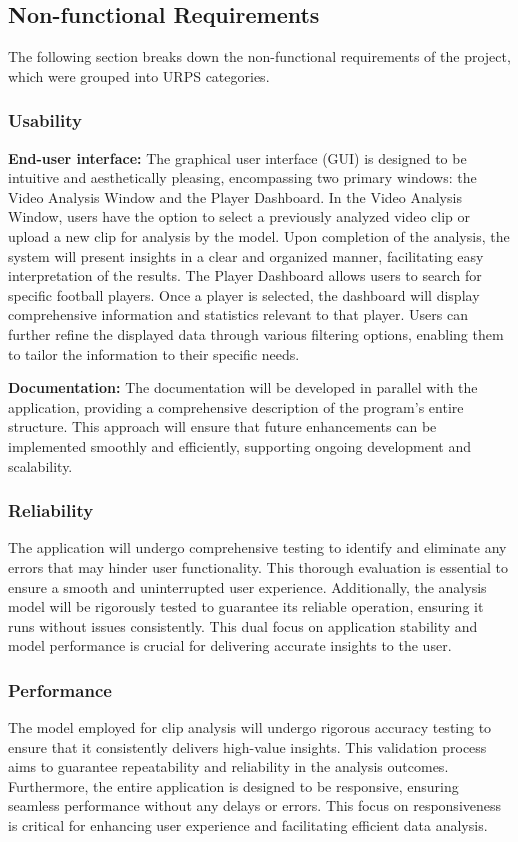 \documentclass{article}
\begin{document}
\subsection{Non-functional Requirements}
The following section breaks down the non-functional requirements of the project, which were grouped into URPS categories.
\subsubsection{Usability}
\textbf{End-user interface:} The graphical user interface (GUI) is designed to be intuitive and aesthetically pleasing, encompassing two primary windows: the Video Analysis Window and the Player Dashboard. In the Video Analysis Window, users have the option to select a previously analyzed video clip or upload a new clip for analysis by the model. Upon completion of the analysis, the system will present insights in a clear and organized manner, facilitating easy interpretation of the results. The Player Dashboard allows users to search for specific football players. Once a player is selected, the dashboard will display comprehensive information and statistics relevant to that player. Users can further refine the displayed data through various filtering options, enabling them to tailor the information to their specific needs.

\vspace{1em}

\noindent \textbf{Documentation:} The documentation will be developed in parallel with the application, providing a comprehensive description of the program's entire structure. This approach will ensure that future enhancements can be implemented smoothly and efficiently, supporting ongoing development and scalability.

\subsubsection{Reliability}
The application will undergo comprehensive testing to identify and eliminate any errors that may hinder user functionality. This thorough evaluation is essential to ensure a smooth and uninterrupted user experience. Additionally, the analysis model will be rigorously tested to guarantee its reliable operation, ensuring it runs without issues consistently. This dual focus on application stability and model performance is crucial for delivering accurate insights to the user.

\subsubsection{Performance}
The model employed for clip analysis will undergo rigorous accuracy testing to ensure that it consistently delivers high-value insights. This validation process aims to guarantee repeatability and reliability in the analysis outcomes. Furthermore, the entire application is designed to be responsive, ensuring seamless performance without any delays or errors. This focus on responsiveness is critical for enhancing user experience and facilitating efficient data analysis. 
\end{document}
